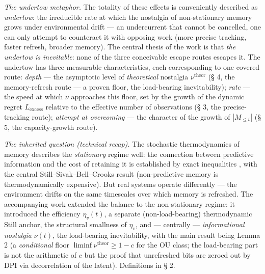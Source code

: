 \documentclass[12pt]{iopart}
\begin{document}
\emph{The undertow metaphor.} The totality of these effects is conveniently described as \emph{undertow}: the irreducible rate at which the nostalgia of non-stationary memory grows under environmental drift --- an undercurrent that cannot be cancelled, one can only attempt to counteract it with opposing work (more precise tracking, faster refresh, broader memory). The central thesis of the work is that \emph{the undertow is inevitable}: none of the three conceivable escape routes escapes it. The undertow has three measurable characteristics, each corresponding to one covered route: \emph{depth} --- the asymptotic level of \emph{theoretical} nostalgia \(\nu^{\text{theor}}\) (§ 4, the memory-refresh route --- a proven floor, the load-bearing inevitability); \emph{rate} --- the speed at which \(\nu\) approaches this floor, set by the growth of the dynamic regret \(L_{\text{excess}}\) relative to the effective number of observations (§ 3, the precise-tracking route); \emph{attempt at overcoming} --- the character of the growth of \(|M_{\le t}|\) (§ 5, the capacity-growth route).



\emph{The inherited question (technical recap).} The stochastic thermodynamics of memory describes the \emph{stationary} regime well: the connection between predictive information \cite{BialekNemenmanTishby2001,CrutchfieldFeldman2003} and the cost of retaining it is established by exact inequalities \cite{Still2012,SagawaUeda2009,Seifert2012}, with the central Still--Sivak--Bell--Crooks result \cite{Still2012} (non-predictive memory is thermodynamically expensive). But real systems operate differently --- the environment drifts on the same timescales over which memory is refreshed. The accompanying work \cite{Andriishin2026b} extended the balance to the non-stationary regime: it introduced the efficiency \(\eta_v(t)\), a separate (non-load-bearing) thermodynamic Still anchor, the structural smallness of \(\eta_v\), and --- centrally --- \emph{informational nostalgia} \(\nu(t)\), the load-bearing inevitability, with the main result being Lemma 2 (a \emph{conditional} floor \(\liminf\nu^{\text{theor}} \ge 1-c\) for the OU class; the load-bearing part is not the arithmetic of \(c\) but the proof that unrefreshed bits are zeroed out by DPI via decorrelation of the latent). Definitions in § 2.
\end{document}

